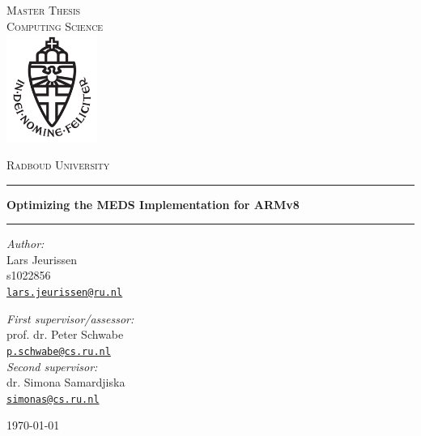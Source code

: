 \documentclass[11pt,a4paper]{report}
\theoremstyle{definition}
\begin{document}
\begin{titlepage}
  \begin{center}
    \textsc{\LARGE Master Thesis\\Computing Science}\\[1.5cm]
    \includegraphics[height=100pt]{logo}

    \vspace{0.4cm}
    \textsc{\Large Radboud University}\\[1cm]
    \hrule
    \vspace{0.4cm}
    \textbf{\huge Optimizing the MEDS Implementation for ARMv8}\\[0.4cm]
    \vspace{0.2cm}
    \hrule
    \vspace{2cm}
    \begin{minipage}[t]{0.45\textwidth}
      \begin{flushleft} \large
        \textit{Author:}\\
        Lars Jeurissen\\
        s1022856\\
        \texttt{\href{mailto:lars.jeurissen@ru.nl}{lars.jeurissen@ru.nl}}
      \end{flushleft}
    \end{minipage}
    \begin{minipage}[t]{0.45\textwidth}
      \begin{flushright} \large
        \textit{First supervisor/assessor:}\\
        prof. dr. Peter Schwabe\\
        \texttt{\href{mailto:p.schwabe@cs.ru.nl}{p.schwabe@cs.ru.nl}}\\[1.3cm]
        \textit{Second supervisor:}\\
        dr. Simona Samardjiska\\
        \texttt{\href{mailto:simonas@cs.ru.nl}{simonas@cs.ru.nl}}
      \end{flushright}
    \end{minipage}
    \vfill
    {\large \today}
  \end{center}
\end{titlepage}
\end{document}
